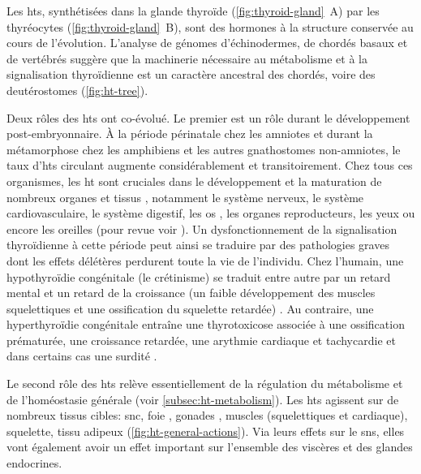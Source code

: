 \documentclass[../main.tex]{subfiles}
\begin{document}


Les \glspl{ht}, synthétisées dans la glande thyroïde (\autoref{fig:thyroid-gland}~A) par les thyréocytes (\autoref{fig:thyroid-gland}~B), sont des hormones à la structure conservée au cours de l'évolution.
L'analyse de génomes d'échinodermes, de chordés basaux et de vertébrés suggère que la machinerie nécessaire au métabolisme et à la signalisation thyroïdienne est un caractère ancestral des chordés, voire des deutérostomes \citep{Paris2008} (\autoref{fig:ht-tree}).



Deux rôles des \glspl{ht} ont co-évolué.
Le premier est un rôle durant le développement post-embryonnaire.
À la période périnatale chez les amniotes et durant la métamorphose chez les amphibiens et les autres gnathostomes non-amniotes, le taux d'\glspl{ht} circulant augmente considérablement et transitoirement.
Chez tous ces organismes, les \gls{ht} sont cruciales dans le développement et la maturation de nombreux organes et tissus \citep{Boelaert2005}, notamment le système nerveux, le système cardiovasculaire, le système digestif, les os \citep{Wojcicka2013a}, les organes reproducteurs, les yeux ou encore les oreilles (pour revue voir \citealp{Wagner2008,Ojamaa2010}).
Un dysfonctionnement de la signalisation thyroïdienne à cette période peut ainsi se traduire par des pathologies graves dont les effets délétères perdurent toute la vie de l'individu.
Chez l'humain, une hypothyroïdie congénitale (le crétinisme) se traduit entre autre par un retard mental et un retard de la croissance (un faible développement des muscles squelettiques et une ossification du squelette retardée) \citep{Zimmermann2009}.
Au contraire, une hyperthyroïdie congénitale entraîne une thyrotoxicose associée à une ossification prématurée, une croissance retardée, une arythmie cardiaque et tachycardie et dans certains cas une surdité \citep{Krude1997}.
\par
Le second rôle des \glspl{ht} relève essentiellement de la régulation du métabolisme et de l'homéostasie générale (voir \autoref{subsec:ht-metabolism}).
Les \glspl{ht} agissent sur de nombreux tissus cibles: \gls{snc}, foie \citep{Weitzel2003}, gonades \citep{Wagner2008}, muscles (squelettiques et cardiaque), squelette, tissu adipeux (\autoref{fig:ht-general-actions}).
Via leurs effets sur le \gls{sns}, elles vont également avoir un effet important sur l'ensemble des viscères et des glandes endocrines.
\end{document}
